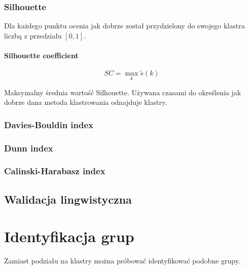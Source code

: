 \documentclass{article}
\begin{document}
\subsubsection{Silhouette}

Dla każdego punktu ocenia jak dobrze został przydzielony do swojego klastra
liczbą z przedziału $[0,1]$.

\paragraph{Silhouette coefficient}

\[ SC = \max_k \tilde{s}(k) \]

Maksymalny średnia wartość Silhouette. Używana czasami do określenia jak
dobrze dana metoda klastrowania odnajduje klastry.

\subsubsection{Davies-Bouldin index}

\subsubsection{Dunn index}

\subsubsection{Calinski-Harabasz index}

\subsection{Walidacja lingwistyczna}

\section{Identyfikacja grup}

Zamiast podziału na klastry można próbować identyfikować podobne grupy.
\end{document}
